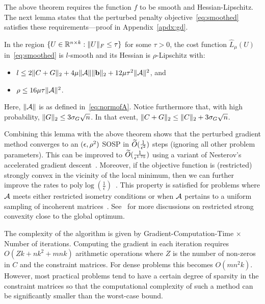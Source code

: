 The above theorem requires the function $f$ to be smooth and Hessian-Lipschitz. The next lemma states that the perturbed penalty objective~\eqref{eq:smoothed} satisfies these requirements---proof in Appendix~\ref{apdx:gd}. %
\begin{lemma}\label{lem:gd_param}
In the region $\{U \in \mathbb{R}^{n\times k} : \|U\|_F \leq \tau \}$ for some $\tau > 0$, the cost function $\hat L_\mu(U)$ in~\eqref{eq:smoothed} is $l$-smooth and its Hessian is $\rho$-Lipschitz with:
\begin{itemize} 
	\item $l \leq 2\|C+G\|_2 + 4 \mu \|\mathcal{A}\| \|\mathbf{b}\|_2 + 12 \mu \tau^2 \|\mathcal{A}\|^2$, and
	\item $\rho \leq 16\mu \tau \|\mathcal{A}\|^2$.
\end{itemize}
Here, $\|\mathcal{A}\|$ is as defined in~\eqref{eq:normofA}. Notice furthermore that, with high probability, $\|G\|_2 \leq 3\sigma_G\sqrt{n}$. In that event, $\|C+G\|_2 \leq \|C\|_2 + 3\sigma_G\sqrt{n}$.
\end{lemma}

Combining this lemma with the above theorem shows that the perturbed gradient method converges to an $(\epsilon, \rho^2)$ SOSP in $\widetilde{O}(\frac{1}{\epsilon^2})$ steps (ignoring all other problem parameters). This can be improved to $\widetilde{O}(\frac{1}{\epsilon^{1.75}})$ using a variant of Nesterov's accelerated gradient descent~\citep{jin2017accelerated}. 
Moreover, if the objective function is (restricted) strongly convex in the vicinity of the local minimum, then we can further improve the rates to $\textrm{poly} \log\left(\frac{1}{\epsilon}\right)$~\citep{jin2017escape}. This property is satisfied for problems where $\mathcal{A}$ meets either restricted isometry conditions or when $\mathcal{A}$ pertains to a uniform sampling of incoherent matrices~\citep{agarwal2010fast, negahban2012restricted,sun2014guaranteed}. See~\citep{bhojanapalli2016dropping} for more discussions on restricted strong convexity close to the global optimum.

The complexity of the algorithm is given by Gradient-Computation-Time $\times $ Number of iterations. Computing the gradient in each iteration requires $O\left(Zk+nk^2 + mnk \right)$ arithmetic operations where $Z$ is the number of non-zeros in $C$ and the constraint matrices. For dense problems this becomes $O\left( mn^2k \right)$. However, most practical problems tend to have a certain degree of sparsity in the constraint matrices so that the computational complexity of such a method can be significantly smaller than the worst-case bound.

